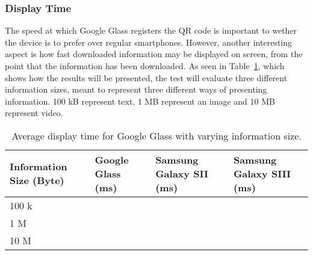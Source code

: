 \subsubsection{Display Time}
The speed at which Google Glass registers the QR code is important to wether the device is to prefer over regular smartphones. However, another interesting aspect is how fast downloaded information may be displayed on screen, from the point that the information has been downloaded. As seen in Table~\ref{tab:averageDisplaySpeedGoogleGlass}, which shows how the results will be presented, the test will evaluate three different information sizes, meant to represent three different ways of presenting information. 100 kB represent text, 1 MB represent an image and 10 MB represent video.

	\begin{table}[ht!]
    		\caption{Average display time for Google Glass with varying information size.} \label{tab:averageDisplaySpeedGoogleGlass}
		\centering \begin{tabularx}{\textwidth}{l|X|X|X} \hline
		\textbf{Information Size (Byte)} & \textbf{Google Glass (ms)}  & \textbf{Samsung Galaxy SII (ms)}  & \textbf{Samsung Galaxy SIII (ms)} \\ \hline \hline
       
		100 k	&	&	&	 \\ \hline
		1 M		&	&	&	 \\ \hline
		10 M		&	&	&	 \\ \hline

		\end{tabularx}
	\end{table}

